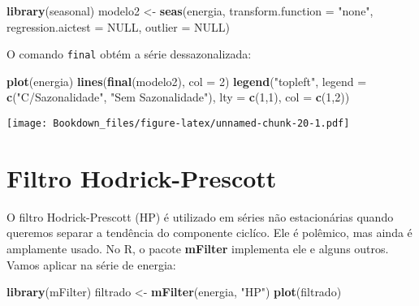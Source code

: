 \documentclass[
]{book}
\newenvironment{Shaded}{\begin{snugshade}}{\end{snugshade}}
\newcommand{\DataTypeTok}[1]{\textcolor[rgb]{0.13,0.29,0.53}{#1}}
\newcommand{\DecValTok}[1]{\textcolor[rgb]{0.00,0.00,0.81}{#1}}
\newcommand{\KeywordTok}[1]{\textcolor[rgb]{0.13,0.29,0.53}{\textbf{#1}}}
\newcommand{\NormalTok}[1]{#1}
\newcommand{\OtherTok}[1]{\textcolor[rgb]{0.56,0.35,0.01}{#1}}
\newcommand{\StringTok}[1]{\textcolor[rgb]{0.31,0.60,0.02}{#1}}
\begin{document}
\begin{Shaded}
\begin{Highlighting}[]
\KeywordTok{library}\NormalTok{(seasonal)}
\NormalTok{modelo2 \textless{}{-}}\StringTok{ }\KeywordTok{seas}\NormalTok{(energia, }\DataTypeTok{transform.function =} \StringTok{"none"}\NormalTok{, }\DataTypeTok{regression.aictest =} \OtherTok{NULL}\NormalTok{, }\DataTypeTok{outlier =} \OtherTok{NULL}\NormalTok{)}
\end{Highlighting}
\end{Shaded}

O comando \texttt{final} obtém a série dessazonalizada:

\begin{Shaded}
\begin{Highlighting}[]
\KeywordTok{plot}\NormalTok{(energia)}
\KeywordTok{lines}\NormalTok{(}\KeywordTok{final}\NormalTok{(modelo2), }\DataTypeTok{col =} \DecValTok{2}\NormalTok{)}
\KeywordTok{legend}\NormalTok{(}\StringTok{"topleft"}\NormalTok{, }\DataTypeTok{legend =} \KeywordTok{c}\NormalTok{(}\StringTok{"C/Sazonalidade"}\NormalTok{, }\StringTok{"Sem Sazonalidade"}\NormalTok{), }\DataTypeTok{lty =} \KeywordTok{c}\NormalTok{(}\DecValTok{1}\NormalTok{,}\DecValTok{1}\NormalTok{), }\DataTypeTok{col =} \KeywordTok{c}\NormalTok{(}\DecValTok{1}\NormalTok{,}\DecValTok{2}\NormalTok{))}
\end{Highlighting}
\end{Shaded}

\texttt{[image: Bookdown\_files/figure-latex/unnamed-chunk-20-1.pdf]}

\hypertarget{filtro-hodrick-prescott}{%
\section{Filtro Hodrick-Prescott}\label{filtro-hodrick-prescott}}

O filtro Hodrick-Prescott (HP) é utilizado em séries não estacionárias quando queremos separar a tendência do componente ciclíco. Ele é polêmico, mas ainda é amplamente usado. No R, o pacote \textbf{mFilter} implementa ele e alguns outros. Vamos aplicar na série de energia:

\begin{Shaded}
\begin{Highlighting}[]
\KeywordTok{library}\NormalTok{(mFilter)}
\NormalTok{filtrado \textless{}{-}}\StringTok{ }\KeywordTok{mFilter}\NormalTok{(energia, }\StringTok{"HP"}\NormalTok{)}
\KeywordTok{plot}\NormalTok{(filtrado)}
\end{Highlighting}
\end{Shaded}
\end{document}
